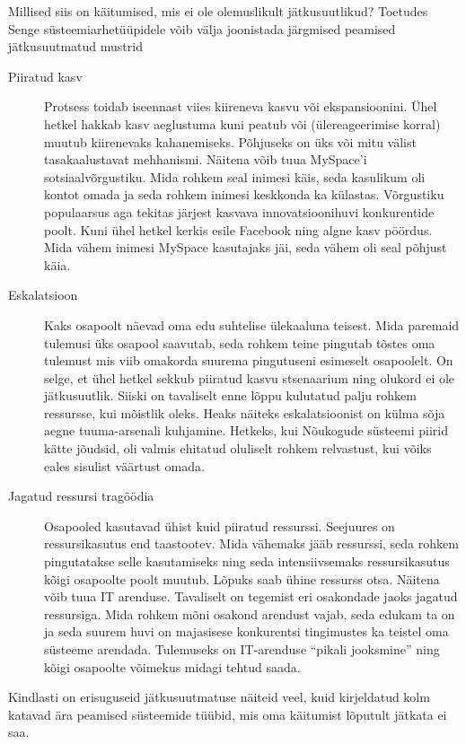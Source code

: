Millised siis on käitumised, mis ei ole olemuslikult jätkusuutlikud? Toetudes Senge\cite{senge19905th} süsteemiarhetüüpidele võib välja joonistada järgmised peamised jätkusuutmatud mustrid
\begin{description}
	\item[Piiratud kasv] Protsess toidab iseennast viies kiireneva kasvu või ekspansioonini. Ühel hetkel hakkab kasv aeglustuma kuni peatub või (ülereageerimise korral) muutub kiirenevaks kahanemiseks. Põhjuseks on üks või mitu välist tasakaalustavat mehhanismi. Näitena võib tuua MySpace'i sotsiaalvõrgustiku. Mida rohkem seal inimesi käis, seda kasulikum oli kontot omada ja seda rohkem inimesi keskkonda ka külastas. Võrgustiku populaarsus aga tekitas järjest kasvava innovatsioonihuvi konkurentide poolt. Kuni ühel hetkel kerkis esile Facebook ning algne kasv pöördus. Mida vähem inimesi MySpace kasutajaks jäi, seda vähem oli seal põhjust käia.
	\item[Eskalatsioon] Kaks osapoolt näevad oma edu suhtelise ülekaaluna teisest. Mida paremaid tulemusi üks osapool saavutab, seda rohkem teine pingutab tõstes oma tulemust mis viib omakorda suurema pingutuseni esimeselt osapoolelt. On selge, et ühel hetkel sekkub piiratud kasvu stsenaarium ning olukord ei ole jätkusuutlik. Siiski on tavaliselt enne lõppu kulutatud palju rohkem ressursse, kui mõistlik oleks. Heaks näiteks eskalatsioonist on külma sõja aegne tuuma-arsenali kuhjamine. Hetkeks, kui Nõukogude süsteemi piirid kätte jõudsid, oli valmis ehitatud oluliselt rohkem relvastust, kui võiks eales sisulist väärtust omada.
	\item[Jagatud ressursi tragöödia] Osapooled kasutavad ühist kuid piiratud ressurssi. Seejuures on ressursikasutus end taastootev. Mida vähemaks jääb ressurssi, seda rohkem pingutatakse selle kasutamiseks ning seda intensiivsemaks ressursikasutus kõigi osapoolte poolt muutub. Lõpuks saab ühine ressurss otsa. Näitena võib tuua IT arenduse. Tavaliselt on tegemist eri osakondade jaoks jagatud ressursiga. Mida rohkem mõni osakond arendust vajab, seda edukam ta on ja seda suurem huvi on majasisese konkurentsi tingimustes ka teistel oma süsteeme arendada. Tulemuseks on IT-arenduse \enquote{pikali jooksmine} ning kõigi osapoolte võimekus midagi tehtud saada.
	
\end{description}

Kindlasti on erisuguseid jätkusuutmatuse näiteid veel, kuid kirjeldatud kolm katavad ära peamised süsteemide tüübid, mis oma käitumist lõputult jätkata ei saa.

